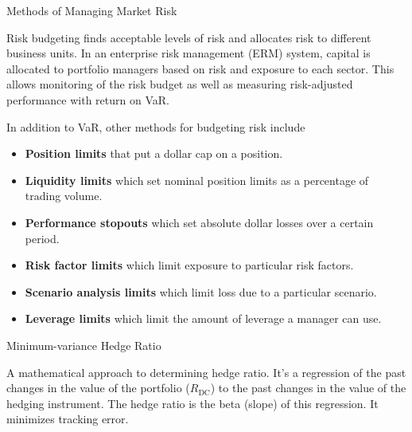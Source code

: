 \documentclass[../custom]{flashcards}
\begin{document}
\begin{flashcard}[\studyArea]{Methods of Managing Market Risk}
    \begin{flushleft}
        Risk budgeting finds acceptable levels of risk and allocates risk to different business units. In an enterprise risk management (ERM) system, capital is allocated to portfolio managers based on risk and exposure to each sector. This allows monitoring of the risk budget as well as measuring risk-adjusted performance with return on VaR.\newline

        In addition to VaR, other methods for budgeting risk include
        \begin{itemize}
            \item \textbf{Position limits} that put a dollar cap on a position.
            \item \textbf{Liquidity limits} which set nominal position limits as a percentage of trading volume.
            \item \textbf{Performance stopouts} which set absolute dollar losses over a certain period.
            \item \textbf{Risk factor limits} which limit exposure to particular risk factors.
            \item \textbf{Scenario analysis limits} which limit loss due to a particular scenario.
            \item \textbf{Leverage limits} which limit the amount of leverage a manager can use.
        \end{itemize}
    \end{flushleft}
\end{flashcard}

\begin{flashcard}[\studyArea]{Minimum-variance Hedge Ratio}
    \begin{flushleft}
        A mathematical approach to determining hedge ratio. It's a regression of the past changes in the value of the portfolio ($R_{\text{DC}}$) to the past changes in the value of the hedging instrument. The hedge ratio is the beta (slope) of this regression. It minimizes tracking error.
    \end{flushleft}
\end{flashcard}
\end{document}
